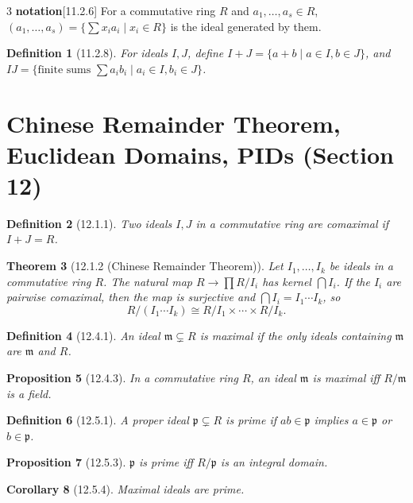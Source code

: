 \documentclass[10pt,landscape]{article}
\newtheorem{theorem}{Theorem}[section]
\newtheorem{definition}[theorem]{Definition}
\newtheorem{proposition}[theorem]{Proposition}
\newtheorem{corollary}[theorem]{Corollary}
\begin{document}
\begin{multicols}{3}
\textbf{notation}[11.2.6]
For a commutative ring $R$ and $a_1,\dots,a_s\in R$, $(a_1,\dots,a_s) = \{\sum x_i a_i \mid x_i\in R\}$ is the ideal generated by them.


\begin{definition}[11.2.8]
For ideals $I,J$, define $I+J = \{a+b\mid a\in I,b\in J\}$, and $IJ = \{\text{finite sums } \sum a_i b_i \mid a_i\in I, b_i\in J\}$.
\end{definition}

\section{Chinese Remainder Theorem, Euclidean Domains, PIDs (Section 12)}

\begin{definition}[12.1.1]
Two ideals $I,J$ in a commutative ring are comaximal if $I+J=R$.
\end{definition}

\begin{theorem}[12.1.2 (Chinese Remainder Theorem)]
Let $I_1,\dots,I_k$ be ideals in a commutative ring $R$. The natural map $R\to \prod R/I_i$ has kernel $\bigcap I_i$. If the $I_i$ are pairwise comaximal, then the map is surjective and $\bigcap I_i = I_1\cdots I_k$, so
\[
R/(I_1\cdots I_k) \cong R/I_1\times\cdots\times R/I_k.
\]
\end{theorem}

\begin{definition}[12.4.1]
An ideal $\mathfrak{m}\subsetneq R$ is maximal if the only ideals containing $\mathfrak{m}$ are $\mathfrak{m}$ and $R$.
\end{definition}

\begin{proposition}[12.4.3]
In a commutative ring $R$, an ideal $\mathfrak{m}$ is maximal iff $R/\mathfrak{m}$ is a field.
\end{proposition}

\begin{definition}[12.5.1]
A proper ideal $\mathfrak{p}\subsetneq R$ is prime if $ab\in\mathfrak{p}$ implies $a\in\mathfrak{p}$ or $b\in\mathfrak{p}$.
\end{definition}

\begin{proposition}[12.5.3]
$\mathfrak{p}$ is prime iff $R/\mathfrak{p}$ is an integral domain.
\end{proposition}

\begin{corollary}[12.5.4]
Maximal ideals are prime.
\end{corollary}


\end{multicols}
\end{document}
